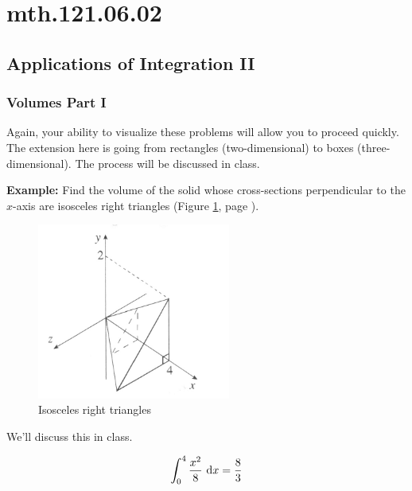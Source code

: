 \documentclass[12pt,addpoints, answers, fleqn]{exam}
\begin{document}
\vfill
\pagebreak

\section{mth.121.06.02}
\subsection{Applications of Integration II}



\subsubsection{Volumes Part I}
Again, your ability to visualize these problems will allow you to proceed quickly. The extension here is going from rectangles (two-dimensional) to boxes (three-dimensional). The process will be discussed in class.



\textbf{Example:} Find the volume of the solid whose cross-sections perpendicular to the $x$-axis are isosceles right triangles (Figure \ref{fig:graph3103}, page \pageref{fig:graph3103}).
\begin{figure}[htbp] %
   \centering
   \includegraphics[width=2.5in]{./graphics/graph3103.pdf} 
   \caption{Isosceles right triangles}
   \label{fig:graph3103}
\end{figure}



\begin{solution}
We'll discuss this in class.

\[
\int_0^4 \frac{x^2}{8} \ {\rm{d}} x = \frac{8}{3}
\]
\end{solution}
\end{document}
